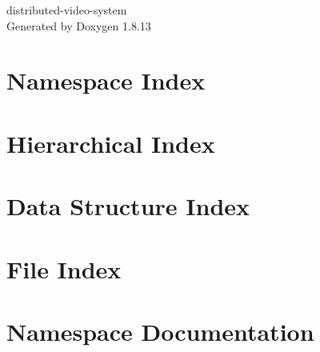 \documentclass[twoside]{book}
\newcommand{\+}{\discretionary{\mbox{\scriptsize$\hookleftarrow$}}{}{}}
\newcommand{\clearemptydoublepage}{%
  \newpage{\pagestyle{empty}\cleardoublepage}%
}
\begin{document}
\hypersetup{pageanchor=false,
             bookmarksnumbered=true,
             pdfencoding=unicode
            }
\begin{titlepage}
\vspace*{7cm}
\begin{center}%
{\Large distributed-\/video-\/system }\\
\vspace*{1cm}
{\large Generated by Doxygen 1.8.13}\\
\end{center}
\end{titlepage}
\clearemptydoublepage
{}
\tableofcontents
\clearemptydoublepage
{}
\hypersetup{pageanchor=true}

\chapter{Namespace Index}

\chapter{Hierarchical Index}

\chapter{Data Structure Index}

\chapter{File Index}

\chapter{Namespace Documentation}



\end{document}
